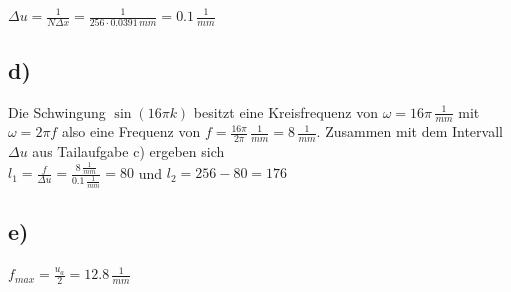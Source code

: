 \documentclass[a4paper,11pt,oneside]{scrartcl}
\begin{document}
$\Delta u=\frac{1}{N\Delta x}=\frac{1}{256\cdot0.0391\,mm}= 0.1\,\frac{1}{mm}$

\subsection*{d)}

Die Schwingung $\sin(16\pi k)$ besitzt eine Kreisfrequenz von $\omega=16\pi\,\frac{1}{mm}$ mit $\omega=2\pi f$ also eine Frequenz von $f=\frac{16\pi}{2\pi}\,\frac{1}{mm}=8\,\frac{1}{mm}$. Zusammen mit dem Intervall $\Delta u$ aus Tailaufgabe c) ergeben sich \\

$l_{1}=\frac{f}{\Delta u}=\frac{8\,\frac{1}{mm}}{0.1\,\frac{1}{mm}}=80$ und $l_{2}=256-80=176$

\subsection*{e)}

$f_{max}=\frac{u_{a}}{2}=12.8\,\frac{1}{mm}$
\end{document}
